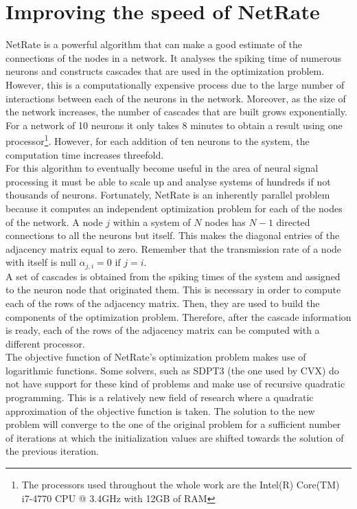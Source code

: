 
\graphicspath{ {project/} }
\chapter{Improving the speed of NetRate}

NetRate is a powerful algorithm that can make a good estimate of the connections of the nodes in a network. It analyses the spiking time of numerous neurons and constructs cascades that are used in the optimization problem. However, this is a computationally expensive process due to the large number of interactions between each of the neurons in the network. Moreover, as the size of the network increases, the number of cascades that are built grows exponentially. For a network of 10 neurons it only takes 8 minutes to obtain a result using one processor\footnote{The processors used throughout the whole work are the Intel(R) Core(TM) i7-4770 CPU @ 3.4GHz with 12GB of RAM}. However, for each addition of ten neurons to the system, the computation time increases threefold. \\

For this algorithm to eventually become useful in the area of neural signal processing it must be able to scale up and analyse systems of hundreds if not thousands of neurons. Fortunately, NetRate is an inherently parallel problem because it computes an independent optimization problem for each of the nodes of the network. A node \(j\) within a system of \(N\) nodes has \(N-1\) directed connections to all the neurons but itself. This makes the diagonal entries of the adjacency matrix equal to zero. Remember that the transmission rate of a node with itself is null \(\alpha_{j,i} = 0 \text{ if } j=i\). \\ 

A set of cascades is obtained from the spiking times of the system and assigned to the neuron node that originated them. This is necessary in order to compute each of the rows of the adjacency matrix. Then, they are used to build the components of the optimization problem. Therefore, after the cascade information is ready, each of the rows of the adjacency matrix can be computed with a different processor.\\

The objective function of NetRate's optimization problem makes use of logarithmic functions. Some solvers, such as SDPT3 \cite{toh1999sdpt3,tutuncu2003solving} (the one used by CVX) do not have support for these kind of problems and make use of recursive quadratic programming. This is a relatively new field of research \cite{powell1986recursive} where a quadratic approximation of the objective function is taken. The solution to the new problem will converge to the one of the original problem for a sufficient number of iterations at which the initialization values are shifted towards the solution of the previous iteration.\\

